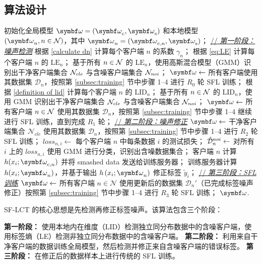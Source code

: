 \subsection{算法设计}
\begin{algorithm}[t]
\caption{SF-LCT 算法}\label{alg1}
\begin{algorithmic}[1]
\STATE 初始化全局模型 $\omegab=(\omegabc,\omegabs)$ 和本地模型 $(\omegab_n, n\in\N)$，其中 $\omegab_n = (\omegabcn, \omegabs)$；
\STATE \underline{// \textit{第一阶段：噪声检测}}
\STATE 根据 \eqref{calculate dn} 计算每个客户端 $n$ 的系数 $\gamma_n$；
\STATE 根据 \eqref{eq:LE} 计算每个客户端 $n$ 的 $\text{LE}_n$；
\STATE 基于所有 $n\in\mathcal{N}$ 的 $\text{LE}_{n}$，使用高斯混合模型（GMM）识别出干净客户端集合 $\mathcal{N}_{cle}$ 与含噪客户端集合 $\mathcal{N}_{noi}$；
\ELSE
\STATE $\omegab\leftarrow$ 所有客户端使用其数据集 $\mathcal{D}_n$，按照第 \ref{subsec:training} 节中步骤 1--4 进行 $R_0$ 轮 SFL 训练；
\STATE 根据 \eqref{definition of lid} 计算每个客户端 $n$ 的 $\text{LID}_n$；
\STATE 基于所有 $n\in\mathcal{N}$ 的 $\text{LID}_{n}$，使用 GMM 识别出干净客户端集合 $\mathcal{N}_{cle}$ 与含噪客户端集合 $\mathcal{N}_{noi}$；
\ENDIF
\STATE $\omegab\leftarrow$ 所有客户端 $n\in\mathcal{N}$ 使用其数据集 $\mathcal{D}_n$，按照第 \ref{subsec:training} 节中步骤 1--4 继续进行 SFL 训练，直到完成 $R_1$ 轮；
\STATE \underline{// \textit{第二阶段：噪声修正}}
\STATE $\omegab\leftarrow$ 干净客户端集合 $\mathcal{N}_{cle}$ 使用其数据集 $\mathcal{D}_n$，按照第 \ref{subsec:training} 节中步骤 1--4 进行 $R_2$ 轮 SFL 训练；
\STATE $loss_{n,i} \leftarrow$ 每个客户端 $n$ 中每条数据 $i$ 的测试损失；
\STATE $\hat{\mathcal{D}}^{noi}_n\leftarrow$ 对所有 $i$ 上的 $loss_{n,i}$ 使用 GMM 进行分类，识别出含噪数据集合；
\STATE 客户端 $n$ 计算 $h(x_i;\omegabcn)$ 并将 smashed data 发送给训练服务器；
\STATE 训练服务器计算 $h(x_i;\omegab_n)$，并基于输出 $h\left(x_i;\omegab_n \right)$ 修正标签 $\tilde{y}_i$；
\ENDFOR
\ENDFOR
\STATE \underline{// \textit{第三阶段：SFL 训练}}
\STATE $\omegab\leftarrow$ 所有客户端 $n\in\mathcal{N}$ 使用更新后的数据集 $\mathcal{D}_n'$（已完成标签噪声修正）按照第 \ref{subsec:training} 节中步骤 1--4 进行 $R_3$ 轮 SFL 训练；
\RETURN $\omegab$.
\end{algorithmic}
\end{algorithm}

SF-LCT 的核心思想是先检测再修正标签噪声。该算法包含三个阶段：

 \textbf{第一阶段：} 使用本地内在维度（LID）检测独立同分布数据中的含噪客户端，使用标签熵（LE）检测非独立同分布数据中的含噪客户端。
 \textbf{第二阶段：} 利用来自干净客户端的数据训练全局模型，然后检测并修正来自含噪客户端的错误标签。
 \textbf{第三阶段：} 在修正后的数据样本上进行传统的 SFL 训练。

